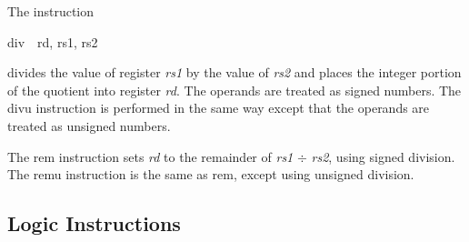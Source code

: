 \documentclass[11pt, twoside, pdftex]{article}
\begin{document}
\noindent
The instruction
\vspace{-\baselineskip}
\begin{center}
{\sf div~~rd, rs1, rs2}
\end{center}
\noindent
divides the value of register {\it rs1} by the value of {\it rs2} and places the integer
portion of the quotient into register {\it rd}. The operands are treated as signed numbers.
The {\sf divu} instruction is performed in the same way except that the operands are treated 
as unsigned numbers.

The {\sf rem} instruction sets {\it rd} to the remainder of {\it rs1} $\div$ {\it rs2},
using signed division. The {\sf remu} instruction is the same as {\sf rem}, except using unsigned
division.

\subsection{Logic Instructions}
\end{document}
